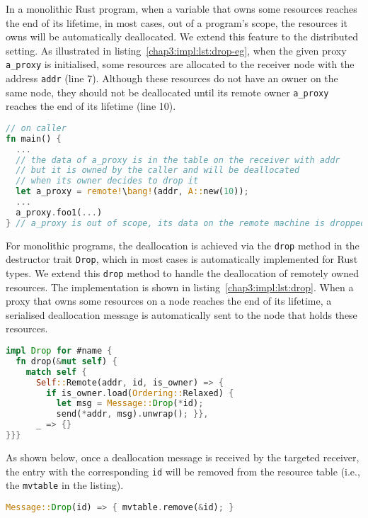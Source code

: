In a monolithic Rust program, when a variable that owns some resources reaches the end of its lifetime, in most cases, out of a program's scope, the resources it owns will be automatically deallocated. We extend this feature to the distributed setting. As illustrated in listing~\ref{chap3:impl:lst:drop-eg}, when the given proxy \lstinline{a_proxy} is initialised, some resources are allocated to the receiver node with the address \lstinline{addr} (line 7). Although these resources do not have an owner on the same node, they should not be deallocated until its remote owner \lstinline{a_proxy} reaches the end of its lifetime (line 10).
\begin{lstlisting}[language=Rust, style=boxed, basicstyle=\footnotesize\ttfamily, caption={An example of a remote deallocation}, label=chap3:impl:lst:drop-eg]
// on caller
fn main() {
  ...
  // the data of a_proxy is in the table on the receiver with addr
  // but it is owned by the caller and will be deallocated
  // when its owner decides to drop it
  let a_proxy = remote!\bang!(addr, A::new(10)); 
  ...
  a_proxy.foo1(...)
} // a_proxy is out of scope, its data on the remote machine is dropped
\end{lstlisting}

For monolithic programs, the deallocation is achieved via the \lstinline{drop} method in the destructor trait \lstinline{Drop}, which in most cases is automatically implemented for Rust types. We extend this \lstinline{drop} method to handle the deallocation of remotely owned resources. The implementation is shown in listing~\ref{chap3:impl:lst:drop}. When a proxy that owns some resources on a node reaches the end of its lifetime, a serialised deallocation message is automatically sent to the node that holds these resources.
\begin{lstlisting}[language=Rust, style=boxed, basicstyle=\footnotesize\ttfamily, caption={The implementation of a remote deallocation}, label=chap3:impl:lst:drop]
impl Drop for #name {
  fn drop(&mut self) {
    match self {
      Self::Remote(addr, id, is_owner) => {
        if is_owner.load(Ordering::Relaxed) {
          let msg = Message::Drop(*id);
          send(*addr, msg).unwrap(); }},
      _ => {}
}}}
\end{lstlisting} 

As shown below, once a deallocation message is received by the targeted receiver, the entry with the corresponding \lstinline{id} will be removed from the resource table (i.e., the \lstinline{mvtable} in the listing). 
\begin{lstlisting}[language=Rust, style=boxed, basicstyle=\footnotesize\ttfamily]
Message::Drop(id) => { mvtable.remove(&id); }
\end{lstlisting}

